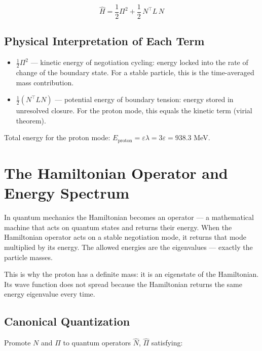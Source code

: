 \documentclass[11pt,letterpaper]{article}
\newenvironment{plainbox}{\begin{tcolorbox}[colback=blue!3!white,colframe=blue!40!white,title={\small\textit{In plain language}},breakable]}{\end{tcolorbox}}
\begin{document}
\begin{equation}
\boxed{\hat{H} = \frac{1}{2}\Pi^2 + \frac{1}{2}\,N^\top L\, N}
\end{equation}

\subsection{Physical Interpretation of Each Term}
\label{sec:orgc2d74e8}

\begin{itemize}
\item \(\tfrac{1}{2}\Pi^2\) --- kinetic energy of negotiation cycling: energy locked into the rate of change of the boundary state. For a stable particle, this is the time-averaged mass contribution.
\item \(\tfrac{1}{2}(N^\top L N)\) --- potential energy of boundary tension: energy stored in unresolved closure. For the proton mode, this equals the kinetic term (virial theorem).
\end{itemize}

Total energy for the proton mode: \(E_\text{proton} = \varepsilon \lambda = 3\varepsilon = 938.3\) MeV.

\section{The Hamiltonian Operator and Energy Spectrum}
\label{sec:org46724dc}

\begin{plainbox}
In quantum mechanics the Hamiltonian becomes an operator --- a mathematical machine that acts on quantum states and returns their energy. When the Hamiltonian operator acts on a stable negotiation mode, it returns that mode multiplied by its energy. The allowed energies are the eigenvalues --- exactly the particle masses.

This is why the proton has a definite mass: it is an eigenstate of the Hamiltonian. Its wave function does not spread because the Hamiltonian returns the same energy eigenvalue every time.
\end{plainbox}

\subsection{Canonical Quantization}
\label{sec:orgcf7f365}

Promote \(N\) and \(\Pi\) to quantum operators \(\hat{N}\), \(\hat{\Pi}\) satisfying:
\end{document}
